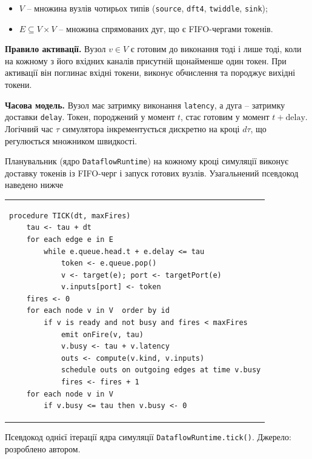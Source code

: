 \documentclass[
]{article}
\newcounter{none} %
\begin{document}
\begin{itemize}
\item
  \(V\) -- множина вузлів чотирьох типів (\texttt{source},
  \texttt{dft4}, \texttt{twiddle}, \texttt{sink});
\item
  \(E \subseteq V \times V\) -- множина спрямованих дуг, що є
  FIFO-чергами токенів.
\end{itemize}

\textbf{Правило активації.} Вузол \(v \in V\) є готовим до виконання
тоді і лише тоді, коли на кожному з його вхідних каналів присутній
щонайменше один токен. При активації він поглинає вхідні токени, виконує
обчислення та породжує вихідні токени.

\textbf{Часова модель.} Вузол має затримку виконання \texttt{latency}, а
дуга -- затримку доставки \texttt{delay}. Токен, породжений у момент
\(t\), стає готовим у момент \(t + \text{delay}\). Логічний час \(\tau\)
симулятора інкрементується дискретно на кроці \(d\tau\), що регулюється
множником швидкості.

Планувальник (ядро \texttt{DataflowRuntime}) на кожному кроці симуляції
виконує доставку токенів із FIFO-черг і запуск готових вузлів.
Узагальнений псевдокод наведено нижче

{\def\LTcaptype{none} %
\begin{longtable}[]{@{}
  >{\raggedright\arraybackslash}p{}@{}}
\toprule\noalign{}
\endhead
\bottomrule\noalign{}
\endlastfoot
\begin{minipage}[t]{\linewidth}\raggedright
\begin{verbatim}
procedure TICK(dt, maxFires)
    tau <- tau + dt
    for each edge e in E
        while e.queue.head.t + e.delay <= tau
            token <- e.queue.pop()
            v <- target(e); port <- targetPort(e)
            v.inputs[port] <- token
    fires <- 0
    for each node v in V  order by id
        if v is ready and not busy and fires < maxFires
            emit onFire(v, tau)
            v.busy <- tau + v.latency
            outs <- compute(v.kind, v.inputs)
            schedule outs on outgoing edges at time v.busy
            fires <- fires + 1
    for each node v in V
        if v.busy <= tau then v.busy <- 0
\end{verbatim}
\end{minipage} \\
\end{longtable}
}

Псевдокод однієї ітерації ядра симуляції
\texttt{DataflowRuntime.tick}\texttt{()}. Джерело: розроблено автором.
\end{document}
